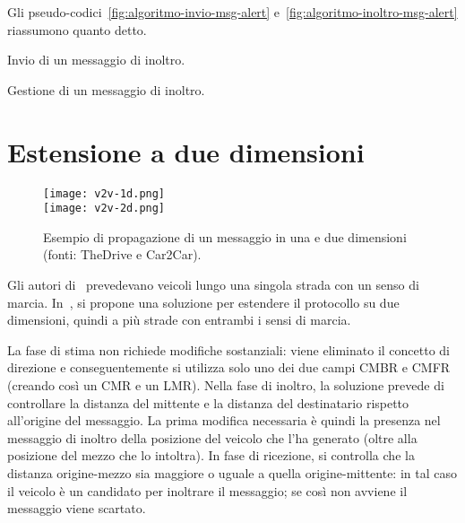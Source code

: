 Gli pseudo-codici~\ref{fig:algoritmo-invio-msg-alert} e~\ref{fig:algoritmo-inoltro-msg-alert} riassumono quanto detto.
%
\begin{italianalgorithm}[h]
\caption{Invio di un messaggio di inoltro.}\label{fig:algoritmo-invio-msg-alert}
\begin{algorithmic}[1]
\end{algorithmic}
\end{italianalgorithm}
%
\begin{italianalgorithm}[h]
\caption{Gestione di un messaggio di inoltro.}\label{fig:algoritmo-inoltro-msg-alert}
\begin{algorithmic}[1]
	\Else{}
	\EndIf{}
\end{algorithmic}
\end{italianalgorithm}
%
\section{Estensione a due dimensioni}\label{sec:fb-estensione-due-dimensioni}
%
\begin{figure}[htbp]
	\centering
		\texttt{[image: v2v-1d.png]} \\
		\vspace{7pt}
		\texttt{[image: v2v-2d.png]}
\caption{Esempio di propagazione di un messaggio in una e due dimensioni (fonti: TheDrive e Car2Car).\label{fig:v2v-1d-2d}}
\end{figure}
%
Gli autori di~\cite{Palazzi07howdo} prevedevano veicoli lungo una singola strada con un senso di marcia.
In~\cite{Barichello2017propagazione}, si propone una soluzione per estendere il protocollo su due dimensioni,
quindi a più strade con entrambi i sensi di marcia.

La fase di stima non richiede modifiche sostanziali: viene eliminato il concetto di direzione e conseguentemente si utilizza solo uno dei due campi CMBR e CMFR
(creando così un CMR e un LMR).
Nella fase di inoltro, la soluzione prevede di controllare la distanza del mittente e la distanza del destinatario rispetto all'origine del messaggio.
La prima modifica necessaria è quindi la presenza nel messaggio di inoltro della posizione del veicolo che l'ha generato (oltre alla posizione del mezzo che lo intoltra).
In fase di ricezione, si controlla che la distanza origine-mezzo sia maggiore o uguale a quella origine-mittente: in tal caso il veicolo è un candidato per inoltrare il messaggio;
se così non avviene il messaggio viene scartato.
